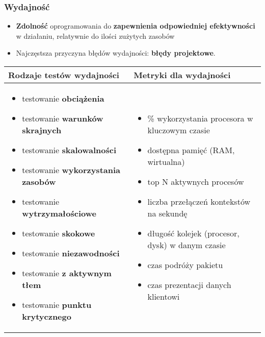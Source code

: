 \documentclass[../main.tex]{subfiles}
\begin{document}
    \subsubsection{Wydajność}
    \begin{itemize}
        \item \textbf{Zdolność} oprogramowania do \textbf{zapewnienia odpowiedniej efektywności} w działaniu, relatywnie do
        ilości zużytych zasobów
        \item Najczęstsza przyczyna błędów wydajności: \textbf{błędy projektowe}.
    \end{itemize}


    \begin{table}[H]
        \begin{center}
            \begin{tabular}{ p{8cm} | p{8cm} }
                \textbf{Rodzaje testów} wydajności & \textbf{Metryki} dla wydajności\\
                \hline
                \begin{itemize}
                    \item testowanie \textbf{obciążenia}
                    \item testowanie \textbf{warunków skrajnych}
                    \item testowanie \textbf{skalowalności}
                    \item testowanie \textbf{wykorzystania zasobów}
                    \item testowanie \textbf{wytrzymałościowe}
                    \item testowanie \textbf{skokowe}
                    \item testowanie \textbf{niezawodności}
                    \item testowanie \textbf{z aktywnym tłem}
                    \item testowanie \textbf{punktu krytycznego}
                \end{itemize}
                &
                \begin{itemize}
                    \item \% wykorzystania procesora w kluczowym czasie
                    \item dostępna pamięć (RAM, wirtualna)
                    \item top N aktywnych procesów
                    \item liczba przełączeń kontekstów na sekundę
                    \item długość kolejek (procesor, dysk) w danym czasie
                    \item czas podróży pakietu
                    \item czas prezentacji danych klientowi
                \end{itemize}\\
            \end{tabular}
        \end{center}
    \end{table}
\end{document}
